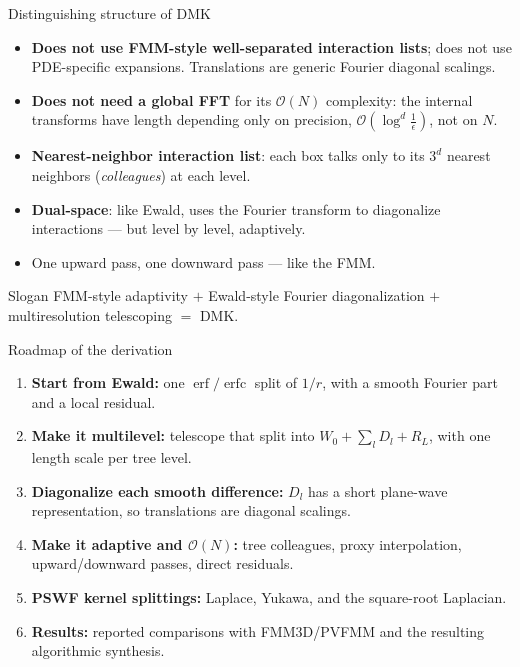 \documentclass[aspectratio=169,11pt]{beamer}
\newcommand{\cO}{\mathcal{O}}
\newcommand{\hl}[1]{{\color{CCMorange}\textbf{#1}}}
\DeclareMathOperator{\erf}{erf}
\DeclareMathOperator{\erfc}{erfc}
\begin{document}
\begin{frame}{Distinguishing structure of DMK}
\small
\begin{itemize}
  \item \hl{Does not use FMM-style well-separated interaction lists}; does not
  use PDE-specific expansions. Translations are generic Fourier diagonal
  scalings.
  \item \hl{Does not need a global FFT} for its \(\cO(N)\) complexity: the internal transforms have length depending only on precision, \(\cO(\log^d\tfrac1\epsilon)\), not on \(N\).
  \item \hl{Nearest-neighbor interaction list}: each box talks only to its \(3^d\) nearest neighbors (\emph{colleagues}) at each level.
  \item \hl{Dual-space}: like Ewald, uses the Fourier transform to diagonalize interactions --- but level by level, adaptively.
  \item One upward pass, one downward pass --- like the FMM.
\end{itemize}
\vspace{1mm}
\begin{block}{Slogan}
FMM-style adaptivity \(+\) Ewald-style Fourier diagonalization \(+\)
multiresolution telescoping \(=\) DMK.
\end{block}
\end{frame}

\begin{frame}{Roadmap of the derivation}
\small
\begin{enumerate}
  \item \textbf{Start from Ewald:} one \(\erf/\erfc\) split of \(1/r\), with a
  smooth Fourier part and a local residual.
  \item \textbf{Make it multilevel:} telescope that split into
  \(W_0+\sum_lD_l+R_L\), with one length scale per tree level.
  \item \textbf{Diagonalize each smooth difference:} \(D_l\) has a short
  plane-wave representation, so translations are diagonal scalings.
  \item \textbf{Make it adaptive and \(\cO(N)\):} tree colleagues, proxy
  interpolation, upward/downward passes, direct residuals.
  \item \textbf{PSWF kernel splittings:} Laplace, Yukawa, and the
  square-root Laplacian.
  \item \textbf{Results:} reported comparisons with FMM3D/PVFMM and the resulting algorithmic synthesis.
\end{enumerate}
\end{frame}
\end{document}
